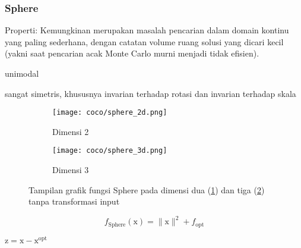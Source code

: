\subsubsection*{Sphere}
\noindent Properti:
Kemungkinan merupakan masalah pencarian dalam domain kontinu yang paling sederhana, dengan catatan volume ruang solusi yang dicari kecil (yakni saat pencarian acak Monte Carlo murni menjadi tidak efisien).
\begin{packed_item}
  \item unimodal
  \item sangat simetris, khususnya invarian terhadap rotasi dan invarian terhadap skala
\end{packed_item}
\begin{figure}[H]
	\centering
	\begin{subfigure}[b]{0.4\textwidth}
		\centering
		\texttt{[image: coco/sphere\_2d.png]}
		\caption{Dimensi 2}
		\label{fig:sphere-coco-2d}
	\end{subfigure}
	\hfill
	\begin{subfigure}[b]{0.4\textwidth}
		\centering
		\texttt{[image: coco/sphere\_3d.png]}
		\caption{Dimensi 3}
		\label{fig:sphere-coco-3d}
	\end{subfigure}
	\caption{Tampilan grafik fungsi Sphere pada dimensi dua (\cref{fig:sphere-coco-2d}) dan tiga (\cref{fig:sphere-coco-3d}) tanpa transformasi input}
	\label{fig:sphere_coco}
\end{figure}
\begin{equation}
  f_{\text{Sphere}}(\mathrm{x})=\|\mathrm{x}\|^2+f_{\text{opt}}
\end{equation}
\begin{packed_item}
    \item $\mathrm{z}=\mathrm{x}-\mathrm{x}^{\text{opt}}$
\end{packed_item}

